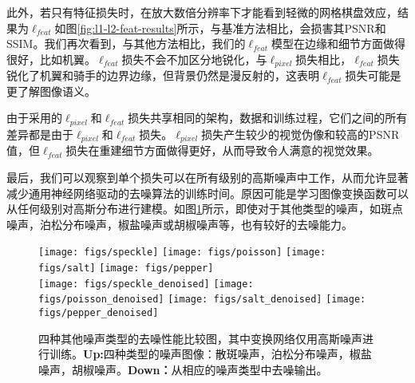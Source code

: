 此外，若只有特征损失时，在放大数倍分辨率下才能看到轻微的网格棋盘效应，结果为$ \ell_{feat} $如图\ref{fig:l1-l2-feat-results}所示，与基准方法相比，会损害其PSNR和SSIM。我们再次看到，与其他方法相比，我们的$ \ell_{feat} $模型在边缘和细节方面做得很好，比如机翼。$ \ell_{feat} $损失不会不加区分地锐化，与$ \ell_{pixel} $损失相比，$ \ell_{feat} $损失锐化了机翼和骑手的边界边缘，但背景仍然是漫反射的，这表明$ \ell_{feat} $损失可能是更了解图像语义。

由于采用的$ \ell_{pixel} $和$ \ell_{feat} $损失共享相同的架构，数据和训练过程，它们之间的所有差异都是由于$ \ell_{pixel} $和$ \ell_{feat} $损失。$ \ell_{pixel} $损失产生较少的视觉伪像和较高的PSNR值，但$ \ell_{feat} $损失在重建细节方面做得更好，从而导致令人满意的视觉效果。

最后，我们可以观察到单个损失可以在所有级别的高斯噪声中工作，从而允许显著减少通用神经网络驱动的去噪算法的训练时间。原因可能是学习图像变换函数可以从任何级别对高斯分布进行建模。如图\ref{fig:other-type-results}所示，即使对于其他类型的噪声，如斑点噪声，泊松分布噪声，椒盐噪声或胡椒噪声等，也有较好的去噪能力。

\begin{figure}[t]
 \centering
   \texttt{[image: figs/speckle]}
  \texttt{[image: figs/poisson]}
  \texttt{[image: figs/salt]}
  \texttt{[image: figs/pepper]} \\{}
  \texttt{[image: figs/speckle\_denoised]}
  \texttt{[image: figs/poisson\_denoised]}
  \texttt{[image: figs/salt\_denoised]}
  \texttt{[image: figs/pepper\_denoised]} \\
    
   \caption[四种其他噪声类型的去噪比较结果图]{四种其他噪声类型的去噪性能比较图，其中变换网络仅用高斯噪声进行训练。\textbf{Up:}四种类型的噪声图像：散斑噪声，泊松分布噪声，椒盐噪声，胡椒噪声。\textbf{Down：}从相应的噪声类型中去噪输出。
   }
   \vspace{-4mm}
   \label{fig:other-type-results}
 \end{figure}
 
